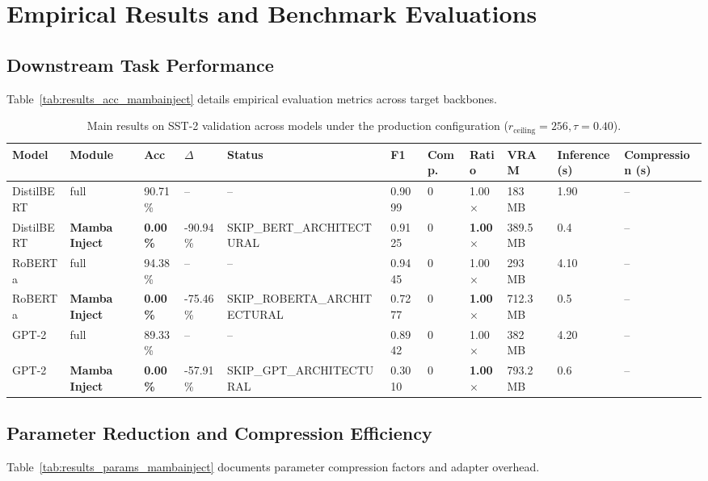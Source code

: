 \section{Empirical Results and Benchmark Evaluations}

\subsection{Downstream Task Performance}
Table~\ref{tab:results_acc_mambainject} details empirical evaluation metrics across target backbones.

\begin{table}[t]
\centering
\small
\begin{tabular}{lllllllllll}
\toprule
\textbf{Model} & \textbf{Module} & \textbf{Acc} & \textbf{$\Delta$} & \textbf{Status} & \textbf{F1} & \textbf{Comp.} & \textbf{Ratio} & \textbf{VRAM} & \textbf{Inference (s)} & \textbf{Compression (s)} \\
\midrule
DistilBERT & full & 90.71\% & -- & -- & 0.9099 & 0 & 1.00$\times$ & 183 MB & 1.90 & -- \\
DistilBERT & \textbf{Mamba Inject} & \textbf{0.00\%} & -90.94\% & SKIP\_BERT\_ARCHITECTURAL & 0.9125 & 0 & \textbf{1.00$\times$} & 389.5 MB & 0.4 & -- \\
RoBERTa & full & 94.38\% & -- & -- & 0.9445 & 0 & 1.00$\times$ & 293 MB & 4.10 & -- \\
RoBERTa & \textbf{Mamba Inject} & \textbf{0.00\%} & -75.46\% & SKIP\_ROBERTA\_ARCHITECTURAL & 0.7277 & 0 & \textbf{1.00$\times$} & 712.3 MB & 0.5 & -- \\
GPT-2 & full & 89.33\% & -- & -- & 0.8942 & 0 & 1.00$\times$ & 382 MB & 4.20 & -- \\
GPT-2 & \textbf{Mamba Inject} & \textbf{0.00\%} & -57.91\% & SKIP\_GPT\_ARCHITECTURAL & 0.3010 & 0 & \textbf{1.00$\times$} & 793.2 MB & 0.6 & -- \\
\bottomrule
\end{tabular}
\caption{Main results on SST-2 validation across models under the production configuration ($r_{\mathrm{ceiling}}=256, \tau=0.40$).}
\label{tab:main_sst2}
\end{table}

\subsection{Parameter Reduction and Compression Efficiency}
Table~\ref{tab:results_params_mambainject} documents parameter compression factors and adapter overhead.

